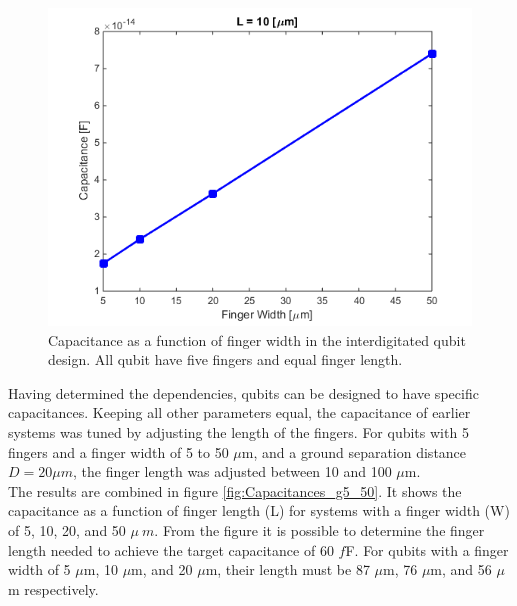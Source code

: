 \begin{figure}
	\centering
	\includegraphics[scale = 0.7]{Figures/Capacitance_Plots/CapVSWidthL10.png}
	\caption{Capacitance as a function of finger width in the interdigitated qubit design. All qubit have five fingers and equal finger length.}
	\label{fig:CapVSWidthL10}
\end{figure}

Having determined the dependencies, qubits can be designed to have specific capacitances. Keeping all other parameters equal, the capacitance of earlier systems was tuned by adjusting the length of the fingers. For qubits with 5 fingers and a finger width of 5 to 50 \(\mu\)m, and a ground separation distance \(D = 20\mu m\), the finger length was adjusted between 10 and 100 \(\mu\)m. \\
The results are combined in figure \ref{fig:Capacitances_g5_50}. It shows the capacitance as a function of finger length (L) for systems with a finger width (W) of 5, 10, 20, and 50 \(\mu\ m\). From the figure it is possible to determine the finger length needed to achieve the target capacitance of 60 \(f\)F. For qubits with a finger width of  5 \(\mu\)m, 10 \(\mu\)m, and 20 \(\mu\)m, their length must be 87 \(\mu\)m, 76 \(\mu\)m, and 56 \(\mu\)m  respectively.   


